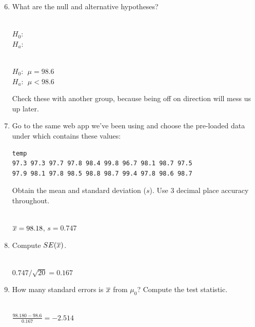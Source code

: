 \begin{enumerate}
\setcounter{enumi}{5}
\item  What are the null and alternative hypotheses?  
\begin{students}
\\$H_0$:  \vspace{1cm}\\
$H_a$:  \vspace{1cm}
\end{students}
\begin{key}
\\ $H_0:\ \ \mu = 98.6$\\
$H_a:\ \ \mu<98.6$
\end{key}

Check these with another group, because being off on
direction will mess us up later.

\item  
Go to the same web app we've been using and choose the pre-loaded
 data under  which contains these values:
\begin{verbatim}
temp
97.3 97.3 97.7 97.8 98.4 99.8 96.7 98.1 98.7 97.5
97.9 98.1 97.8 98.5 98.8 98.7 99.4 97.8 98.6 98.7
\end{verbatim}
 Obtain the mean and standard deviation ($s$). Use 3 decimal
  place accuracy throughout.
\begin{students}
  \vspace{1cm}
\end{students}
\begin{key}
\\ $\overline{x} = 98.18$,  $s = 0.747$
\end{key}

\item Compute $SE(\overline{x})$.
\begin{students}
  \vspace{1cm}
\end{students}
\begin{key}
\\ {\it $0.747/\sqrt{20} = 0.167$}
\end{key}

\item How many standard errors is $\overline{x}$ from $\mu_0$?  Compute the
  test statistic. 
\begin{students}
  \vspace{1cm}
\end{students}
\begin{key}
\\ {\it $ \frac{98.180 - 98.6}{0.167} = -2.514$}
\end{key}



\end{enumerate}
